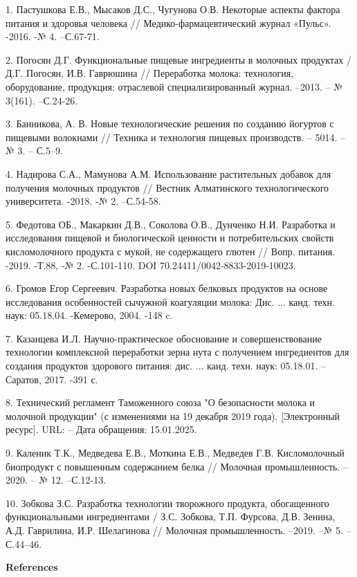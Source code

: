 \begin{references}
1. Пастушкова Е.В., Мысаков Д.С., Чугунова О.В. Некоторые аспекты фактора
питания и здоровья человека // Медико-фармацевтический журнал «Пульс».
-2016. -№ 4. --С.67-71.

2. Погосян Д.Г. Функциональные пищевые ингредиенты в молочных продуктах /
Д.Г. Погосян, И.В. Гаврюшина // Переработка молока: технология,
оборудование, продукция: отраслевой специализированный журнал. --2013.
-- № 3(161). --С.24-26.

3. Банникова, А. В. Новые технологические решения по созданию йогуртов с
пищевыми волокнами // Техника и технология пищевых производств. --
5014. -- № 3. -- С.5--9.

4. Надирова С.А., Мамунова А.М. Использование растительных добавок для
получения молочных продуктов // Вестник Алматинского технологического
университета. -2018. -№ 2. --С.54-58.

5. Федотова ОБ., Макаркин Д.В., Соколова О.В., Дунченко Н.И. Разработка и
исследования пищевой и биологической ценности и потребительских
свойств кисломолочного продукта с мукой, не содержащего глютен //
Вопр. питания. -2019. -Т.88, -№ 2. -С.101-110. DOI
70.24411/0042-8833-2019-10023.

6. Громов Егор Сергеевич. Разработка новых белковых продуктов на основе
исследования особенностей сычужной коагуляции молока: Дис. ... канд.
техн. наук: 05.18.04. -Кемерово, 2004. -148 c.

7. Казанцева И.Л. Научно-практическое обоснование и совершенствование
технологии комплексной переработки зерна нута с получением
ингредиентов для создания продуктов здорового питания: дис. ... канд.
техн. наук: 05.18.01. -- Саратов, 2017. -391 с.

8. Технический регламент Таможенного союза "О безопасности молока и
молочной продукции" (с изменениями на 19 декабря 2019 года).
{[}Электронный ресурс{]}. URL:  --
Дата обращения: 15.01.2025.

9. Каленик Т.К., Медведева Е.В., Моткина Е.В., Медведев Г.В.
Кисломолочный биопродукт с повышенным содержанием белка // Молочная
промышленность. -- 2020. -- № 12. --С.12-13.

10. Зобкова З.С. Разработка технологии творожного продукта, обогащенного
функциональными ингредиентами / З.С. Зобкова, Т.П. Фурсова, Д.В.
Зенина, А.Д. Гаврилина, И.Р. Шелагинова // Молочная промышленность.
--2019. --№ 5. --С.44--46.
\end{references}

\begin{center}
{\bfseries References}
\end{center}

